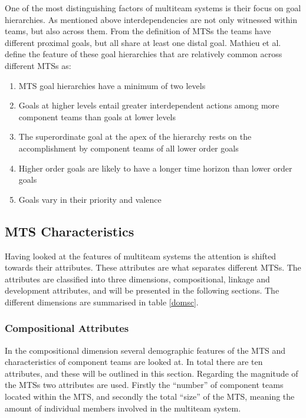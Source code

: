 One of the most distinguishing factors of multiteam systems is their focus on goal hierarchies. As mentioned above interdependencies are not only witnessed within teams, but also across them. From the definition of MTSs the teams have different proximal goals, but all share at least one distal goal. Mathieu et al. define the feature of these goal hierarchies that are relatively common across different MTSs as:

\begin{enumerate}
  \item MTS goal hierarchies have a minimum of two levels
  \item Goals at higher levels entail greater interdependent actions among more component teams than goals at lower levels
  \item The superordinate goal at the apex of the hierarchy rests on the accomplishment by component teams of all lower order goals
  \item Higher order goals are likely to have a longer time horizon than lower order goals
  \item Goals vary in their priority and valence
\end{enumerate}


\subsection{MTS Characteristics}

Having looked at the features of multiteam systems the attention is shifted towards their attributes. These attributes are what separates different MTSs. The attributes are classified into three dimensions, compositional, linkage and development attributes, and will be presented in the following sections. The different dimensions are summarised in table \ref{domsc}.

\subsubsection{Compositional Attributes}

In the compositional dimension several demographic features of the MTS and characteristics of component teams are looked at. In total there are ten attributes, and these will be outlined in this section. Regarding the magnitude of the MTSs two attributes are used. Firstly the ``number'' of component teams located within the MTS, and secondly the total ``size'' of the MTS, meaning the amount of individual members involved in the multiteam system.

